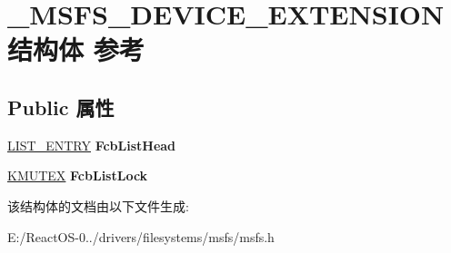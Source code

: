 \hypertarget{struct___m_s_f_s___d_e_v_i_c_e___e_x_t_e_n_s_i_o_n}{}\section{\+\_\+\+M\+S\+F\+S\+\_\+\+D\+E\+V\+I\+C\+E\+\_\+\+E\+X\+T\+E\+N\+S\+I\+O\+N结构体 参考}
\label{struct___m_s_f_s___d_e_v_i_c_e___e_x_t_e_n_s_i_o_n}
\subsection*{Public 属性}
\begin{DoxyCompactItemize}
\item 
\mbox{\label{struct___m_s_f_s___d_e_v_i_c_e___e_x_t_e_n_s_i_o_n_ac6941d93fd6d0137032a70d4fc0470de}} 
\hyperlink{struct___l_i_s_t___e_n_t_r_y}{L\+I\+S\+T\+\_\+\+E\+N\+T\+RY} {\bfseries Fcb\+List\+Head}
\item 
\mbox{\label{struct___m_s_f_s___d_e_v_i_c_e___e_x_t_e_n_s_i_o_n_aa7eadbe1dc84684a055c8edbc6b800c1}} 
\hyperlink{struct___k_m_u_t_a_n_t}{K\+M\+U\+T\+EX} {\bfseries Fcb\+List\+Lock}
\end{DoxyCompactItemize}


该结构体的文档由以下文件生成\+:\begin{DoxyCompactItemize}
\item 
E\+:/\+React\+O\+S-\/0../drivers/filesystems/msfs/msfs.\+h\end{DoxyCompactItemize}
